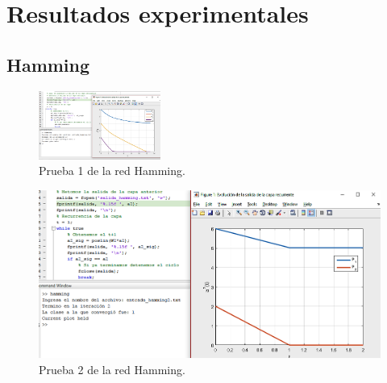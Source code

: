\documentclass[12pt, titlepage]{article}
\begin{document}
    \section{Resultados experimentales}
        \subsection{Hamming}
            \begin{figure}[H]
                \begin{center}
                    \includegraphics[width=4cm]{img/hamming/hamming1.png}
                    \caption{Prueba 1 de la red Hamming.}
                    \label{fig:hamming1}
                \end{center}
            \end{figure}
        
            \begin{figure}[H]
                \begin{center}
                    \includegraphics[width=16cm]{img/hamming/hamming2.png}
                    \caption{Prueba 2 de la red Hamming.}
                    \label{fig:hamming2}
                \end{center}
            \end{figure}
        
\end{document}
